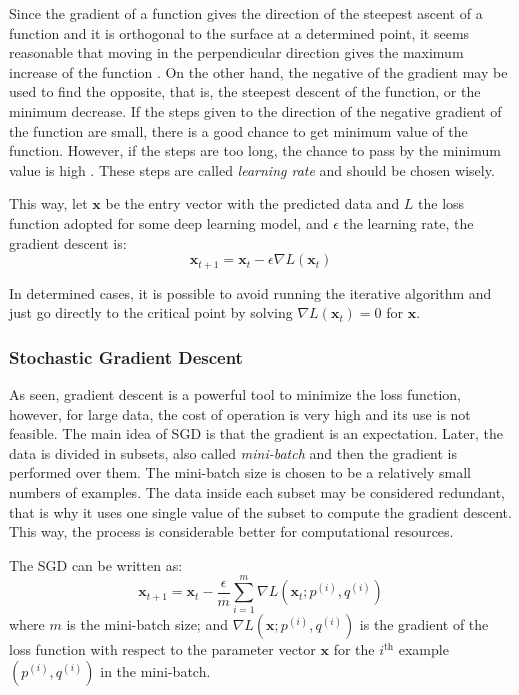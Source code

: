 Since the gradient of a function gives the direction of the steepest ascent of a function and it is orthogonal to the surface at a determined point, it seems reasonable that moving in the perpendicular direction gives the maximum increase of the function \cite{stewart2016}.
On the other hand, the negative of the gradient may be used to find the opposite, that is, the steepest descent of the function, or the minimum decrease.
If the steps given to the direction of the negative gradient of the function are small, there is a good chance to get minimum value of the function.
However, if the steps are too long, the chance to pass by the minimum value is high \cite{nielsen2015}.
These steps are called \emph{learning rate} and should be chosen wisely.

This way, let \(\mathbf{x}\) be the entry vector with the predicted data and \(L\) the loss function adopted for some deep learning model, and \(\epsilon\) the learning rate, the gradient descent is:
%
\begin{equation}
    \mathbf{x}_{t+1} = \mathbf{x}_t - \epsilon \nabla L(\mathbf{x}_t)
\end{equation}

In determined cases, it is possible to avoid running the iterative algorithm and just go directly to the critical point by solving \(\nabla L(\mathbf{x}_t) = 0\) for \(\mathbf{x}\).

\subsubsection*{Stochastic Gradient Descent}

As seen, gradient descent is a powerful tool to minimize the loss function, however, for large data, the cost of operation is very high and its use is not feasible. 
The main idea of SGD is that the gradient is an expectation.
Later, the data is divided in subsets, also called \emph{mini-batch} and then the gradient is performed over them.
The mini-batch size is chosen to be a relatively small numbers of examples.
The data inside each subset may be considered redundant, that is why it uses one single value of the subset to compute the gradient descent.
This way, the process is considerable better for computational resources.

The SGD can be written as:
%
\begin{equation}
    \mathbf{x}_{t+1} = \mathbf{x}_t - \frac{\epsilon}{m} \sum_{i=1}^m \nabla L(\mathbf{x}_t; p^{(i)},q^{(i)})
\end{equation}
%
where \(m\)  is the mini-batch size; and \(\nabla L(\mathbf{x}; p^{(i)}, q^{(i)})\) is the gradient of the loss function with respect to the parameter vector \(\mathbf{x}\) for the \(i^{\text{th}}\) example \((p^{(i)}, q^{(i)})\) in the mini-batch.

